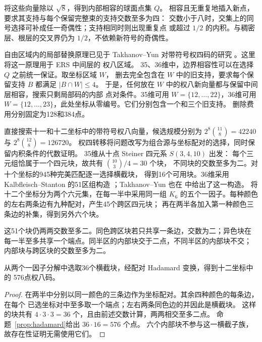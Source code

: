 将这些向量除以 $\sqrt8$，得到内部相容的球面点集 $Q$。
相容且无重复地插入新点，要求其支持与每个保留完整束的支持交数至多为四：
交数小于八时，交集上的同号选择可补成任一奇偶性；支持相同时则出现重复点
或超过 $1/2$ 的内积。与稠密层、根层的交叉界仍为 $1/2$，不依赖新符号的奇偶性。

自由区域内的局部替换原理已见于 Takhanov--Yun 对带符号权四码的研究
\cite[第V节，定义5与引理4]{signed-johnson}。这里将这一原理用于 ERS 中间层的
权八区域。
35、36维中，边界相容性可以在选择 $Q$ 之前统一保证。取坐标区域 $W$，
删去完全包含在 $W$ 中的旧支持，要求每个保留支持 $B$ 都满足 $|B\cap W|\le4$。
于是，任何放在 $W$ 中的权八新向量都与保留中间层相容，搜索只剩局部码的内部
点对条件。35维可用 $W=\{12,\ldots,22\}$，36维可用
$W=\{12,\ldots,23\}$，此处坐标从零编号。它们分别包含一个和三个旧支持。
删除费用分别固定为128和384点。

直接搜索十一和十二坐标中的带符号权八向量，候选规模分别为
$2^8\binom{11}{8}=42240$ 与 $2^8\binom{12}{8}=126720$。
权四转移将问题改写为组合源与坐标配对的选择，同时保留内积条件的代数证明。
35维从十点 Steiner 四元系 $S(3,4,10)$ 出发：
每个三元组恰属于一个四元块，故共有 $\binom{10}{3}/4=30$ 个块，
不同块的交数至多为二。对十个坐标的945种完美匹配逐一选择横截块，
得到16个可用块。36维采用 Kalbfleisch--Stanton 的51区组构造
\cite[定理7]{kalbfleisch-stanton}；Takhanov--Yun 也在
\cite[第V节，构造1]{signed-johnson}中给出了这一构造。
将十二个坐标分为两个六元集，在每一半中采用同一组
$K_6$ 的五个一因子。每种颜色的左右两条边有九种配对，产生45个跨区四元块；
再在两半各加入第一种颜色三条边的补集，得到另外六个块。

这51个块仍两两交数至多二。同色跨区块若只共享一条边，交数为二；异色块在
每一半至多共享一个端点。同半区的内部块交于二点，不同半区的内部块不交；
内部块与跨区块的交数至多为二。

\begin{proposition}[576点局部码]
\label{prop:local36}
从两个一因子分解中选取36个横截块，经配对 Hadamard 变换，得到十二坐标中的
576点权八码。
\end{proposition}
\begin{proof}
在两半中分别以同一颜色的三条边作为坐标配对。其余四种颜色的每条边，在每个
已选坐标对中至多取一个端点；左右两条同色边的并因此是横截块。
这样的块共有 $4\cdot3\cdot3=36$ 个，且由前述交数计算，两两相交至多二点。
命题~\ref{prop:hadamard}给出 $36\cdot16=576$ 个点。
六个内部块不参与这一横截子族，故存在性证明无需使用它们。
\end{proof}

